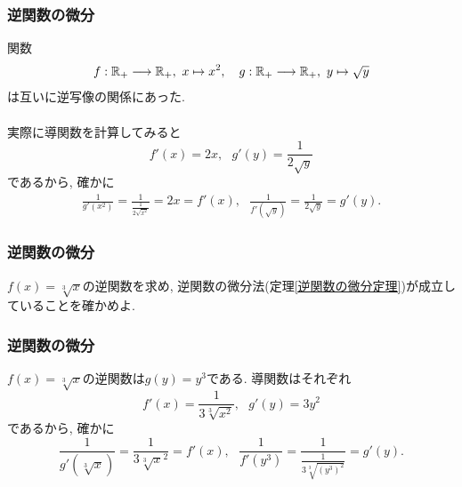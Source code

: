 \begin{frame}
\frametitle{逆関数の微分}


関数
\begin{align*}
f: \mathbb{R}_+ \longrightarrow \mathbb{R}_+,  \  x \mapsto x^2, \ \ \ g: \mathbb{R}_+ \longrightarrow \mathbb{R}_+,  \ y \mapsto \sqrt{y}
\end{align*}
は互いに逆写像の関係にあった. \\
\ \\

実際に導関数を計算してみると
$$
f'(x)=2x, \ \ \ g'(y)= \frac{1}{2\sqrt{y}}
$$
であるから, 確かに
\begin{align*}
 \frac{1}{g'(x^2)} = \frac{1}{\frac{1}{2\sqrt{x^2}}}=2x =f'(x), \ \ \ \frac{1}{f'(\sqrt{y})}=\frac{1}{2\sqrt{y}}=g'(y). 
\end{align*}



\end{frame}





\begin{frame}
\frametitle{逆関数の微分}

\begin{Prob}
$f(x)=\sqrt[3]{x}$の逆関数を求め, 逆関数の微分法(定理\ref{逆関数の微分定理})が成立していることを確かめよ. 
\end{Prob}

\end{frame}





\begin{frame}
\frametitle{逆関数の微分}


$f(x)=\sqrt[3]{x}$の逆関数は$g(y)=y^3$である. 導関数はそれぞれ
$$
f'(x)=\frac{1}{3 \sqrt[3]{x^2}}, \ \ \ g'(y)=3y^2
$$
であるから, 確かに
$$
\frac{1}{g'(\sqrt[3]{x})}=\frac{1}{3\sqrt[3]{x}^2}=f'(x), \ \ \ 
\frac{1}{f'(y^3)}=\frac{1}{\frac{1}{3 \sqrt[3]{(y^3)^2}}}=g'(y). 
$$

\end{frame}





